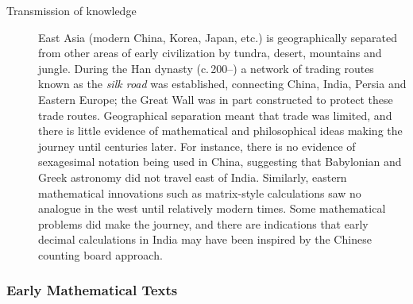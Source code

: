 \begin{description}
  \item[Transmission of knowledge] East Asia (modern China, Korea, Japan, etc.) is geographically separated from other areas of early civilization by tundra, desert, mountains and jungle. During the Han dynasty (c.\,200\BC--) a network of trading routes known as the \emph{silk road} was established, connecting China, India, Persia and Eastern Europe; the Great Wall was in part constructed to protect these trade routes. Geographical separation meant that trade was limited, and there is little evidence of mathematical and philosophical ideas making the journey until centuries later. For instance, there is no evidence of sexagesimal notation being used in China, suggesting that Babylonian and Greek astronomy did not travel east of India. Similarly, eastern mathematical innovations such as matrix-style calculations saw no analogue in the west until relatively modern times. Some mathematical problems did make the journey, and there are indications that early decimal calculations in India may have been inspired by the Chinese counting board approach. %
\end{description}



\subsubsection*{Early Mathematical Texts}

